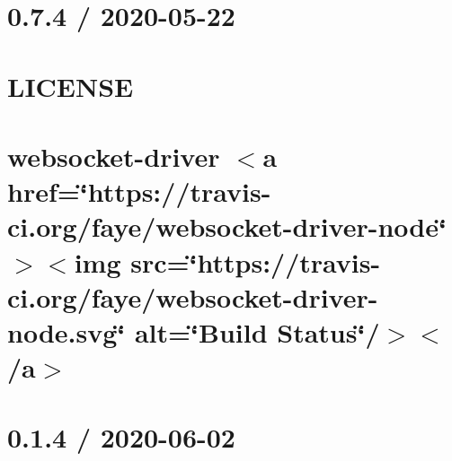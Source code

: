 \documentclass[twoside]{book}
\newcommand{\+}{\discretionary{\mbox{\scriptsize$\hookleftarrow$}}{}{}}
\begin{document}
\chapter{0.7.4 / 2020-\/05-\/22}
\label{md__c___users_vaishnavi_jadhav__desktop__developer_code_mean_stack_example_client_node_modules_wa819eb6e6b7b1861f0b3218404a7ee5f}

\chapter{LICENSE}
\label{md__c___users_vaishnavi_jadhav__desktop__developer_code_mean_stack_example_client_node_modules_websocket_driver__l_i_c_e_n_s_e}

\chapter{websocket-\/driver \texorpdfstring{$<$}{<}a href=\char`\"{}https\+://travis-\/ci.\+org/faye/websocket-\/driver-\/node\char`\"{} \texorpdfstring{$>$}{>}\texorpdfstring{$<$}{<}img src=\char`\"{}https\+://travis-\/ci.\+org/faye/websocket-\/driver-\/node.\+svg\char`\"{} alt=\char`\"{}\+Build Status\char`\"{}/\texorpdfstring{$>$}{>}\texorpdfstring{$<$}{<}/a\texorpdfstring{$>$}{>}}
\label{md__c___users_vaishnavi_jadhav__desktop__developer_code_mean_stack_example_client_node_modules_websocket_driver__r_e_a_d_m_e}

\chapter{0.1.4 / 2020-\/06-\/02}
\label{md__c___users_vaishnavi_jadhav__desktop__developer_code_mean_stack_example_client_node_modules_w5074fcc5fccdc9f157fd3168e6909933}

\end{document}
